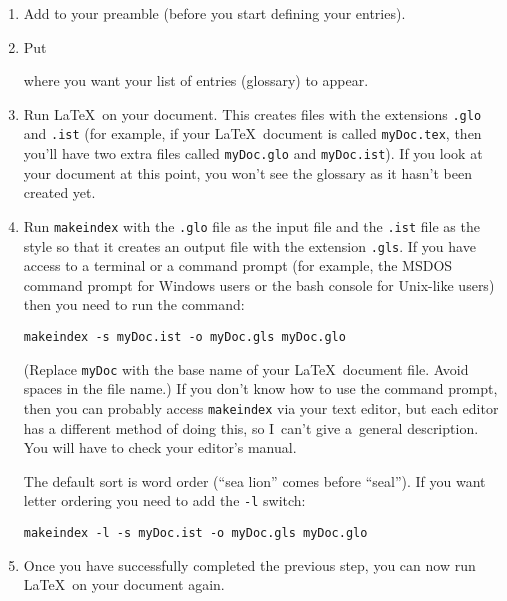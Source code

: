 \documentclass{nlctdoc}
\begin{document}
\begin{description}
   \begin{enumerate}
    \item Add  to your preamble (before you start
    defining your entries).

    \item Put
\begin{definition}
\end{definition}
    where you want your list of entries (glossary) to appear.

    \item Run \LaTeX\ on your document. This creates files with the
    extensions \texttt{.glo} and \texttt{.ist} (for example, if your 
    \LaTeX\ document is called \texttt{myDoc.tex}, then you'll have 
    two extra files called \texttt{myDoc.glo} and \texttt{myDoc.ist}).
    If you look at your document at this point, you won't see the 
    glossary as it hasn't been created yet.

    \item Run \texttt{makeindex} with the \texttt{.glo} file as the
    input file and the \texttt{.ist} file as the style so that
    it creates an output file with the extension \texttt{.gls}. If
    you have access to a terminal or a command prompt (for example, the
    MSDOS command prompt for Windows users or the bash console for
    Unix-like users) then you need to run the command:
\begin{verbatim}
makeindex -s myDoc.ist -o myDoc.gls myDoc.glo
\end{verbatim}
   (Replace \texttt{myDoc} with the base name of your \LaTeX\
    document file. Avoid spaces in the file name.) If you don't know
    how to use the command prompt, then you can probably access
    \texttt{makeindex} via your text editor, but each editor has a
    different method of doing this, so I~can't give a~general
    description. You will have to check your editor's manual.

    The default sort is word order (``sea lion'' comes before ``seal''). 
    If you want letter ordering you need to add the \texttt{-l}
    switch:
\begin{verbatim}
makeindex -l -s myDoc.ist -o myDoc.gls myDoc.glo
\end{verbatim}

    \item Once you have successfully completed the previous step,
    you can now run \LaTeX\ on your document again.
   \end{enumerate}


\end{description}
\end{document}
